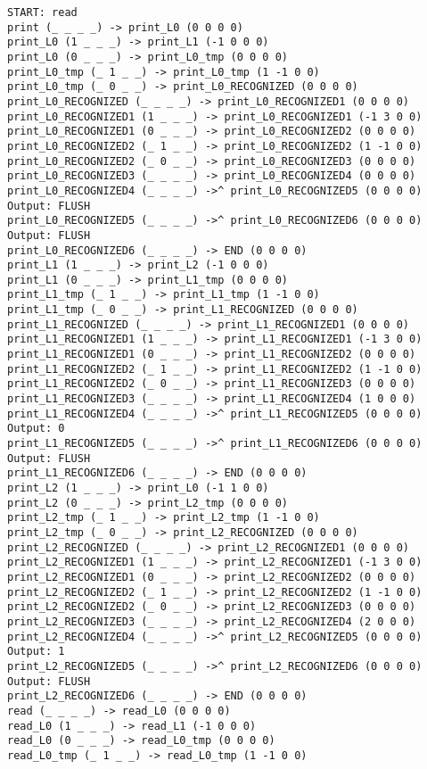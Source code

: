 \documentclass[english,shortabstract,mgr]{iithesis}
\begin{document}
\begin{verbatim}
START: read
print (_ _ _ _) -> print_L0 (0 0 0 0)
print_L0 (1 _ _ _) -> print_L1 (-1 0 0 0)
print_L0 (0 _ _ _) -> print_L0_tmp (0 0 0 0)
print_L0_tmp (_ 1 _ _) -> print_L0_tmp (1 -1 0 0)
print_L0_tmp (_ 0 _ _) -> print_L0_RECOGNIZED (0 0 0 0)
print_L0_RECOGNIZED (_ _ _ _) -> print_L0_RECOGNIZED1 (0 0 0 0)
print_L0_RECOGNIZED1 (1 _ _ _) -> print_L0_RECOGNIZED1 (-1 3 0 0)
print_L0_RECOGNIZED1 (0 _ _ _) -> print_L0_RECOGNIZED2 (0 0 0 0)
print_L0_RECOGNIZED2 (_ 1 _ _) -> print_L0_RECOGNIZED2 (1 -1 0 0)
print_L0_RECOGNIZED2 (_ 0 _ _) -> print_L0_RECOGNIZED3 (0 0 0 0)
print_L0_RECOGNIZED3 (_ _ _ _) -> print_L0_RECOGNIZED4 (0 0 0 0)
print_L0_RECOGNIZED4 (_ _ _ _) ->^ print_L0_RECOGNIZED5 (0 0 0 0) Output: FLUSH
print_L0_RECOGNIZED5 (_ _ _ _) ->^ print_L0_RECOGNIZED6 (0 0 0 0) Output: FLUSH
print_L0_RECOGNIZED6 (_ _ _ _) -> END (0 0 0 0)
print_L1 (1 _ _ _) -> print_L2 (-1 0 0 0)
print_L1 (0 _ _ _) -> print_L1_tmp (0 0 0 0)
print_L1_tmp (_ 1 _ _) -> print_L1_tmp (1 -1 0 0)
print_L1_tmp (_ 0 _ _) -> print_L1_RECOGNIZED (0 0 0 0)
print_L1_RECOGNIZED (_ _ _ _) -> print_L1_RECOGNIZED1 (0 0 0 0)
print_L1_RECOGNIZED1 (1 _ _ _) -> print_L1_RECOGNIZED1 (-1 3 0 0)
print_L1_RECOGNIZED1 (0 _ _ _) -> print_L1_RECOGNIZED2 (0 0 0 0)
print_L1_RECOGNIZED2 (_ 1 _ _) -> print_L1_RECOGNIZED2 (1 -1 0 0)
print_L1_RECOGNIZED2 (_ 0 _ _) -> print_L1_RECOGNIZED3 (0 0 0 0)
print_L1_RECOGNIZED3 (_ _ _ _) -> print_L1_RECOGNIZED4 (1 0 0 0)
print_L1_RECOGNIZED4 (_ _ _ _) ->^ print_L1_RECOGNIZED5 (0 0 0 0) Output: 0
print_L1_RECOGNIZED5 (_ _ _ _) ->^ print_L1_RECOGNIZED6 (0 0 0 0) Output: FLUSH
print_L1_RECOGNIZED6 (_ _ _ _) -> END (0 0 0 0)
print_L2 (1 _ _ _) -> print_L0 (-1 1 0 0)
print_L2 (0 _ _ _) -> print_L2_tmp (0 0 0 0)
print_L2_tmp (_ 1 _ _) -> print_L2_tmp (1 -1 0 0)
print_L2_tmp (_ 0 _ _) -> print_L2_RECOGNIZED (0 0 0 0)
print_L2_RECOGNIZED (_ _ _ _) -> print_L2_RECOGNIZED1 (0 0 0 0)
print_L2_RECOGNIZED1 (1 _ _ _) -> print_L2_RECOGNIZED1 (-1 3 0 0)
print_L2_RECOGNIZED1 (0 _ _ _) -> print_L2_RECOGNIZED2 (0 0 0 0)
print_L2_RECOGNIZED2 (_ 1 _ _) -> print_L2_RECOGNIZED2 (1 -1 0 0)
print_L2_RECOGNIZED2 (_ 0 _ _) -> print_L2_RECOGNIZED3 (0 0 0 0)
print_L2_RECOGNIZED3 (_ _ _ _) -> print_L2_RECOGNIZED4 (2 0 0 0)
print_L2_RECOGNIZED4 (_ _ _ _) ->^ print_L2_RECOGNIZED5 (0 0 0 0) Output: 1
print_L2_RECOGNIZED5 (_ _ _ _) ->^ print_L2_RECOGNIZED6 (0 0 0 0) Output: FLUSH
print_L2_RECOGNIZED6 (_ _ _ _) -> END (0 0 0 0)
read (_ _ _ _) -> read_L0 (0 0 0 0)
read_L0 (1 _ _ _) -> read_L1 (-1 0 0 0)
read_L0 (0 _ _ _) -> read_L0_tmp (0 0 0 0)
read_L0_tmp (_ 1 _ _) -> read_L0_tmp (1 -1 0 0)

\end{verbatim}
\end{document}
